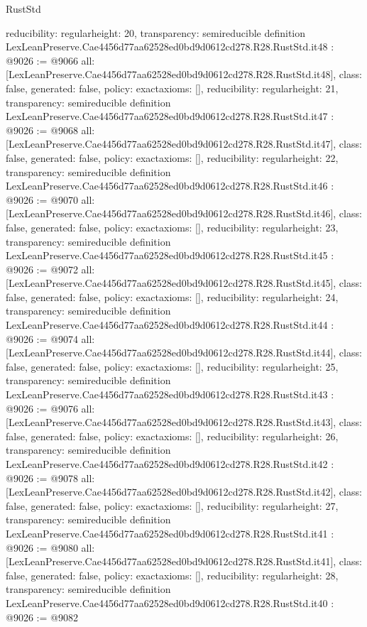 \begin{lexlean}{RustStd}
\begin{coremodule}
{  reducibility: regular{height: 20},
  transparency: semireducible
}
definition LexLeanPreserve.Cae4456d77aa62528ed0bd9d0612cd278.R28.RustStd.it48 : @9026 := @9066 {
  all: [LexLeanPreserve.Cae4456d77aa62528ed0bd9d0612cd278.R28.RustStd.it48],
  class: false,
  generated: false,
  policy: exact{axioms: []},
  reducibility: regular{height: 21},
  transparency: semireducible
}
definition LexLeanPreserve.Cae4456d77aa62528ed0bd9d0612cd278.R28.RustStd.it47 : @9026 := @9068 {
  all: [LexLeanPreserve.Cae4456d77aa62528ed0bd9d0612cd278.R28.RustStd.it47],
  class: false,
  generated: false,
  policy: exact{axioms: []},
  reducibility: regular{height: 22},
  transparency: semireducible
}
definition LexLeanPreserve.Cae4456d77aa62528ed0bd9d0612cd278.R28.RustStd.it46 : @9026 := @9070 {
  all: [LexLeanPreserve.Cae4456d77aa62528ed0bd9d0612cd278.R28.RustStd.it46],
  class: false,
  generated: false,
  policy: exact{axioms: []},
  reducibility: regular{height: 23},
  transparency: semireducible
}
definition LexLeanPreserve.Cae4456d77aa62528ed0bd9d0612cd278.R28.RustStd.it45 : @9026 := @9072 {
  all: [LexLeanPreserve.Cae4456d77aa62528ed0bd9d0612cd278.R28.RustStd.it45],
  class: false,
  generated: false,
  policy: exact{axioms: []},
  reducibility: regular{height: 24},
  transparency: semireducible
}
definition LexLeanPreserve.Cae4456d77aa62528ed0bd9d0612cd278.R28.RustStd.it44 : @9026 := @9074 {
  all: [LexLeanPreserve.Cae4456d77aa62528ed0bd9d0612cd278.R28.RustStd.it44],
  class: false,
  generated: false,
  policy: exact{axioms: []},
  reducibility: regular{height: 25},
  transparency: semireducible
}
definition LexLeanPreserve.Cae4456d77aa62528ed0bd9d0612cd278.R28.RustStd.it43 : @9026 := @9076 {
  all: [LexLeanPreserve.Cae4456d77aa62528ed0bd9d0612cd278.R28.RustStd.it43],
  class: false,
  generated: false,
  policy: exact{axioms: []},
  reducibility: regular{height: 26},
  transparency: semireducible
}
definition LexLeanPreserve.Cae4456d77aa62528ed0bd9d0612cd278.R28.RustStd.it42 : @9026 := @9078 {
  all: [LexLeanPreserve.Cae4456d77aa62528ed0bd9d0612cd278.R28.RustStd.it42],
  class: false,
  generated: false,
  policy: exact{axioms: []},
  reducibility: regular{height: 27},
  transparency: semireducible
}
definition LexLeanPreserve.Cae4456d77aa62528ed0bd9d0612cd278.R28.RustStd.it41 : @9026 := @9080 {
  all: [LexLeanPreserve.Cae4456d77aa62528ed0bd9d0612cd278.R28.RustStd.it41],
  class: false,
  generated: false,
  policy: exact{axioms: []},
  reducibility: regular{height: 28},
  transparency: semireducible
}
definition LexLeanPreserve.Cae4456d77aa62528ed0bd9d0612cd278.R28.RustStd.it40 : @9026 := @9082 {
}
\end{coremodule}
\end{lexlean}
